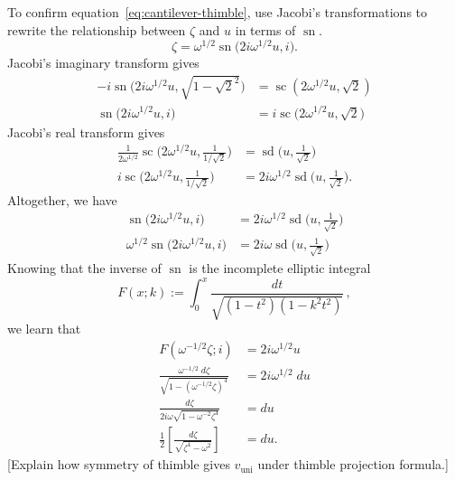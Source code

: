 \documentclass{article}
\theoremstyle{definition}
\theoremstyle{plain}
\newenvironment{verify}{\color{ForestGreen}}{\color{black}}
\newenvironment{todo}{\color{Coral}}{\color{black}}
\begin{document}
To confirm equation~\eqref{eq:cantilever-thimble}, use Jacobi's transformations to rewrite the relationship between $\zeta$ and $u$ in terms of $\operatorname{sn}$.
\[ \zeta = \omega^{1/2} \operatorname{sn}\big(2i \omega^{1/2} u, i\big). \]
\begin{verify}
Jacobi's imaginary transform gives
\begin{align*}
-i \operatorname{sn}\big(2i \omega^{1/2} u, \sqrt{1-\sqrt{2}^2}\big) & = \operatorname{sc}(2\omega^{1/2} u, \sqrt{2}) \\
\operatorname{sn}\big(2i \omega^{1/2} u, i\big) & = i \operatorname{sc}\big(2\omega^{1/2} u,\sqrt{2}\big)
\end{align*}
Jacobi's real transform gives
\begin{align*}
\frac{1}{2\omega^{1/2}} \operatorname{sc}\big(2\omega^{1/2} u, \tfrac{1}{1/\sqrt{2}}\big) & = \operatorname{sd}\big(u, \tfrac{1}{\sqrt{2}}\big) \\
i \operatorname{sc}\big(2\omega^{1/2} u, \tfrac{1}{1/\sqrt{2}}\big) & = 2i \omega^{1/2} \operatorname{sd}\big(u, \tfrac{1}{\sqrt{2}}\big).
\end{align*}
Altogether, we have
\begin{align*}
\operatorname{sn}\big(2i \omega^{1/2} u, i\big) & = 2i \omega^{1/2} \operatorname{sd}\big(u, \tfrac{1}{\sqrt{2}}\big) \\
\omega^{1/2} \operatorname{sn}\big(2i \omega^{1/2} u, i\big) & = 2i\omega \operatorname{sd}\big(u, \tfrac{1}{\sqrt{2}}\big)
\end{align*}
\end{verify}
Knowing that the inverse of $\operatorname{sn}$ is the incomplete elliptic integral
\begin{equation}
F(x;k):=\int_0^x \frac{dt}{\sqrt{(1-t^2)(1-k^2t^2)}}\,,
\end{equation}
we learn that
\begin{align*}
F(\omega^{-1/2} \zeta; i) & = 2i \omega^{1/2} u \\
\frac{\omega^{-1/2}\;d\zeta}{\sqrt{1 - (\omega^{-1/2} \zeta)^4}} & = 2i \omega^{1/2}\;du \\
\frac{d\zeta}{2i \omega \sqrt{1 - \omega^{-2} \zeta^4}} & = du \\
\frac{1}{2}\left[\frac{d\zeta}{\sqrt{\zeta^4 - \omega^2}}\right] & = du.
\end{align*}
\begin{todo}[Explain how symmetry of thimble gives $v_\text{uni}$ under thimble projection formula.]\end{todo}
%
\appendix
%
\end{document}
